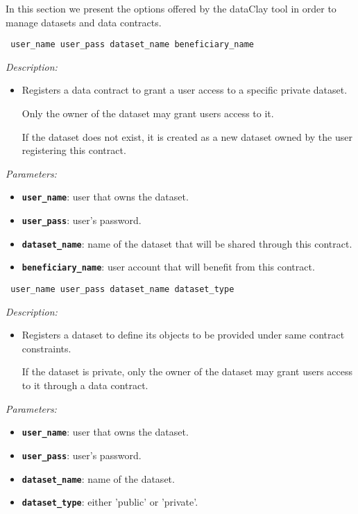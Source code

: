 In this section we present the options offered by the dataClay tool in order to manage datasets and data contracts.

\begin{dBox}
\texttt{ \newline user\_name user\_pass dataset\_name beneficiary\_name}
\LINE

{\it Description:}

\begin{itemize}
    \item Registers a data contract to grant a user access to a specific private dataset.
    
    Only the owner of the dataset may grant users access to it.
    
    If the dataset does not exist, it is created as a new dataset owned by the user registering this contract.
\end{itemize}

{\it Parameters:}

\begin{itemize}
    \item \texttt{\bfseries user\_name}: user that owns the dataset.
    \item \texttt{\bfseries user\_pass}: user's password.
    \item \texttt{\bfseries dataset\_name}: name of the dataset that will be shared through this contract.
    \item \texttt{\bfseries beneficiary\_name}: user account that will benefit from this contract.
\end{itemize}

\end{dBox}


\begin{dBox}
\texttt{ \newline user\_name user\_pass dataset\_name dataset\_type}
\LINE

{\it Description:}

\begin{itemize}
    \item Registers a dataset to define its objects to be provided under same contract constraints.
    
    If the dataset is private, only the owner of the dataset may grant users access to it through a data contract.
\end{itemize}

{\it Parameters:}

\begin{itemize}
    \item \texttt{\bfseries user\_name}: user that owns the dataset.
    \item \texttt{\bfseries user\_pass}: user's password.
    \item \texttt{\bfseries dataset\_name}: name of the dataset.
    \item \texttt{\bfseries dataset\_type}: either 'public' or 'private'.
\end{itemize}

\end{dBox}

